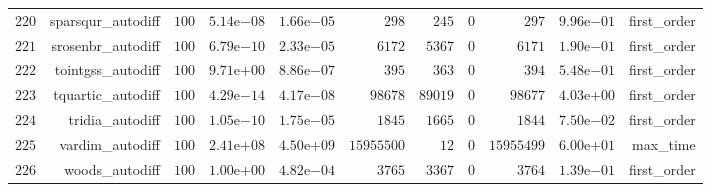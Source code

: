 \documentclass[varwidth=20cm,crop=true]{standalone}
\begin{document}
\begin{longtable}{rrrrrrrrrrr}
  \(   220\) & sparsqur\_autodiff & \(   100\) & \( 5.14\)e\(-08\) & \( 1.66\)e\(-05\) & \(   298\) & \(   245\) & \(     0\) & \(   297\) & \( 9.96\)e\(-01\) & first\_order \\
  \(   221\) & srosenbr\_autodiff & \(   100\) & \( 6.79\)e\(-10\) & \( 2.33\)e\(-05\) & \(  6172\) & \(  5367\) & \(     0\) & \(  6171\) & \( 1.90\)e\(-01\) & first\_order \\
  \(   222\) & tointgss\_autodiff & \(   100\) & \( 9.71\)e\(+00\) & \( 8.86\)e\(-07\) & \(   395\) & \(   363\) & \(     0\) & \(   394\) & \( 5.48\)e\(-01\) & first\_order \\
  \(   223\) & tquartic\_autodiff & \(   100\) & \( 4.29\)e\(-14\) & \( 4.17\)e\(-08\) & \( 98678\) & \( 89019\) & \(     0\) & \( 98677\) & \( 4.03\)e\(+00\) & first\_order \\
  \(   224\) & tridia\_autodiff & \(   100\) & \( 1.05\)e\(-10\) & \( 1.75\)e\(-05\) & \(  1845\) & \(  1665\) & \(     0\) & \(  1844\) & \( 7.50\)e\(-02\) & first\_order \\
  \(   225\) & vardim\_autodiff & \(   100\) & \( 2.41\)e\(+08\) & \( 4.50\)e\(+09\) & \(15955500\) & \(    12\) & \(     0\) & \(15955499\) & \( 6.00\)e\(+01\) & max\_time \\
  \(   226\) & woods\_autodiff & \(   100\) & \( 1.00\)e\(+00\) & \( 4.82\)e\(-04\) & \(  3765\) & \(  3367\) & \(     0\) & \(  3764\) & \( 1.39\)e\(-01\) & first\_order \\\hline
\end{longtable}
\end{document}
